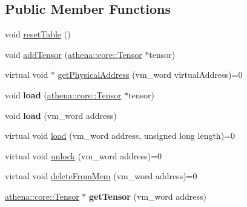 \subsection*{Public Member Functions}
\begin{DoxyCompactItemize}
\item 
void \mbox{\hyperlink{classathena_1_1backend_1_1_abstract_memory_manager_a358f614d4358f5dce28f17dba6917b1f}{reset\+Table}} ()
\item 
void \mbox{\hyperlink{classathena_1_1backend_1_1_abstract_memory_manager_adaa80b617f6f3f19ba5b1ddd2b0377e7}{add\+Tensor}} (\mbox{\hyperlink{classathena_1_1core_1_1_tensor}{athena\+::core\+::\+Tensor}} $\ast$tensor)
\item 
virtual void $\ast$ \mbox{\hyperlink{classathena_1_1backend_1_1_abstract_memory_manager_ad441d7a2281f5f2b2627272d136f72b8}{get\+Physical\+Address}} (vm\+\_\+word virtual\+Address)=0
\item 
\mbox{\label{classathena_1_1backend_1_1_abstract_memory_manager_a05cbbf4adf5928c3fc062184f3e8f518}} 
void {\bfseries load} (\mbox{\hyperlink{classathena_1_1core_1_1_tensor}{athena\+::core\+::\+Tensor}} $\ast$tensor)
\item 
\mbox{\label{classathena_1_1backend_1_1_abstract_memory_manager_a93e2b7f35d2c8c59b76d9a1d2cea281c}} 
void {\bfseries load} (vm\+\_\+word address)
\item 
virtual void \mbox{\hyperlink{classathena_1_1backend_1_1_abstract_memory_manager_af5d4fd46d1bd780edc638aea6b729ff3}{load}} (vm\+\_\+word address, unsigned long length)=0
\item 
virtual void \mbox{\hyperlink{classathena_1_1backend_1_1_abstract_memory_manager_aec859ee3bf6011d8710b2ec4bfc2373e}{unlock}} (vm\+\_\+word address)=0
\item 
virtual void \mbox{\hyperlink{classathena_1_1backend_1_1_abstract_memory_manager_a8ffd6cf21559978f394e2e11815506b5}{delete\+From\+Mem}} (vm\+\_\+word address)=0
\item 
\mbox{\label{classathena_1_1backend_1_1_abstract_memory_manager_abd79e10b1e4d51ed592075138e0076f2}} 
\mbox{\hyperlink{classathena_1_1core_1_1_tensor}{athena\+::core\+::\+Tensor}} $\ast$ {\bfseries get\+Tensor} (vm\+\_\+word address)
\end{DoxyCompactItemize}
